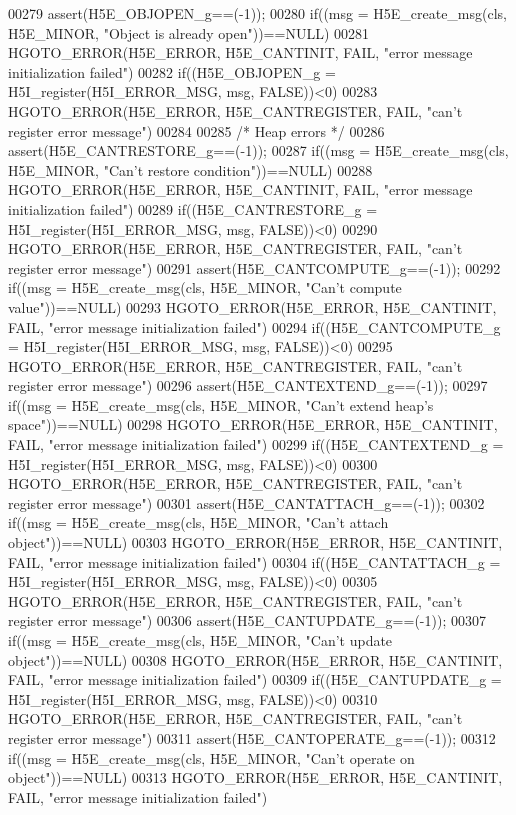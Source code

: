 \begin{DoxyCode}
00279 assert(H5E\_OBJOPEN\_g==(-1));
00280 if((msg = H5E\_create\_msg(cls, H5E\_MINOR, "Object is already open"))==NULL)
00281     HGOTO\_ERROR(H5E\_ERROR, H5E\_CANTINIT, FAIL, "error message initialization failed")
00282 if((H5E\_OBJOPEN\_g = H5I\_register(H5I\_ERROR\_MSG, msg, FALSE))<0)
00283     HGOTO\_ERROR(H5E\_ERROR, H5E\_CANTREGISTER, FAIL, "can't register error message")
00284 
00285 \textcolor{comment}{/* Heap errors */}
00286 assert(H5E\_CANTRESTORE\_g==(-1));
00287 if((msg = H5E\_create\_msg(cls, H5E\_MINOR, "Can't restore condition"))==NULL)
00288     HGOTO\_ERROR(H5E\_ERROR, H5E\_CANTINIT, FAIL, "error message initialization failed")
00289 if((H5E\_CANTRESTORE\_g = H5I\_register(H5I\_ERROR\_MSG, msg, FALSE))<0)
00290     HGOTO\_ERROR(H5E\_ERROR, H5E\_CANTREGISTER, FAIL, "can't register error message")
00291 assert(H5E\_CANTCOMPUTE\_g==(-1));
00292 if((msg = H5E\_create\_msg(cls, H5E\_MINOR, "Can't compute value"))==NULL)
00293     HGOTO\_ERROR(H5E\_ERROR, H5E\_CANTINIT, FAIL, "error message initialization failed")
00294 if((H5E\_CANTCOMPUTE\_g = H5I\_register(H5I\_ERROR\_MSG, msg, FALSE))<0)
00295     HGOTO\_ERROR(H5E\_ERROR, H5E\_CANTREGISTER, FAIL, "can't register error message")
00296 assert(H5E\_CANTEXTEND\_g==(-1));
00297 if((msg = H5E\_create\_msg(cls, H5E\_MINOR, "Can't extend heap's space"))==NULL)
00298     HGOTO\_ERROR(H5E\_ERROR, H5E\_CANTINIT, FAIL, "error message initialization failed")
00299 if((H5E\_CANTEXTEND\_g = H5I\_register(H5I\_ERROR\_MSG, msg, FALSE))<0)
00300     HGOTO\_ERROR(H5E\_ERROR, H5E\_CANTREGISTER, FAIL, "can't register error message")
00301 assert(H5E\_CANTATTACH\_g==(-1));
00302 if((msg = H5E\_create\_msg(cls, H5E\_MINOR, "Can't attach \textcolor{keywordtype}{object}"))==NULL)
00303     HGOTO\_ERROR(H5E\_ERROR, H5E\_CANTINIT, FAIL, "error message initialization failed")
00304 if((H5E\_CANTATTACH\_g = H5I\_register(H5I\_ERROR\_MSG, msg, FALSE))<0)
00305     HGOTO\_ERROR(H5E\_ERROR, H5E\_CANTREGISTER, FAIL, "can't register error message")
00306 assert(H5E\_CANTUPDATE\_g==(-1));
00307 if((msg = H5E\_create\_msg(cls, H5E\_MINOR, "Can't update \textcolor{keywordtype}{object}"))==NULL)
00308     HGOTO\_ERROR(H5E\_ERROR, H5E\_CANTINIT, FAIL, "error message initialization failed")
00309 if((H5E\_CANTUPDATE\_g = H5I\_register(H5I\_ERROR\_MSG, msg, FALSE))<0)
00310     HGOTO\_ERROR(H5E\_ERROR, H5E\_CANTREGISTER, FAIL, "can't register error message")
00311 assert(H5E\_CANTOPERATE\_g==(-1));
00312 if((msg = H5E\_create\_msg(cls, H5E\_MINOR, "Can't operate on \textcolor{keywordtype}{object}"))==NULL)
00313     HGOTO\_ERROR(H5E\_ERROR, H5E\_CANTINIT, FAIL, "error message initialization failed")

\end{DoxyCode}
